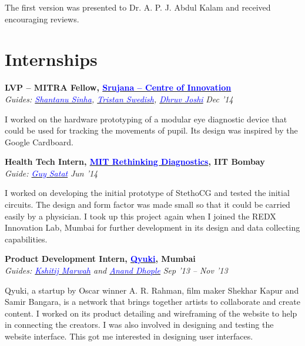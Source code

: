 \documentclass[margin,line]{res}
\newenvironment{list1}{
  \begin{list}{\ding{113}}{%
      \setlength{\itemsep}{0in}
      \setlength{\parsep}{0in} \setlength{\parskip}{0in}
      \setlength{\topsep}{0in} \setlength{\partopsep}{0in}
      \setlength{\leftmargin}{0.17in}}}{\end{list}}
\begin{document}
\begin{resume}
\begin{list1}
\noindent The first version was presented to Dr. A. P. J. Abdul Kalam and received encouraging reviews.
\end{list1}

\section{\sc Internships}

{\bf LVP -- MITRA Fellow, \href{http://lvpmitra.com/}{\textcolor{blue}{Srujana -- Centre of Innovation}}} \hfill  \\
{\em Guides: \href{https://www.media.mit.edu/~sssinha}{\textcolor{blue}{Shantanu Sinha}}, \href{https://web.media.mit.edu/~tswedish/}{\textcolor{blue}{Tristan Swedish}}, \href{https://www.linkedin.com/in/derbedhruv}{\textcolor{blue}{Dhruv Joshi}}} \hfill {\textit{Dec '14}} \\
\vspace*{-.13in}
\begin{list1}
\item[]
I worked on the hardware prototyping of a modular eye diagnostic device that could be used for tracking the movements of pupil. Its design was inspired by the Google Cardboard.
\end{list1}

{\bf Health Tech Intern, \href{https://redxmumbai.wordpress.com/about/}{\textcolor{blue} {MIT Rethinking Diagnostics}}, IIT Bombay} \\
{\em Guide: \href{http://web.media.mit.edu/~guysatat/}{\textcolor{blue}{Guy Satat}}} \hfill {\textit{Jun '14}} \\
\vspace*{-.13in}
\begin{list1}
\item[]
I worked on developing the initial prototype of StethoCG and tested the initial circuits. The design and form factor was made small so that it could be carried easily by a physician. I took up this project again when I joined the REDX Innovation Lab, Mumbai for further development in its design and data collecting capabilities.
\end{list1}

{\bf Product Development Intern, \href{www.qyuki.com}{\textcolor{blue}{Qyuki}}, Mumbai} \\
{\em Guides: \href{http://www.kshitijmarwah.com}{\textcolor{blue}{Kshitij Marwah}} and \href{https://www.linkedin.com/in/ananddhople}{\textcolor{blue}{Anand Dhople}}} \hfill {\textit{Sep '13 -- Nov '13}} \\
\vspace*{-.13in}
\begin{list1}
\item[]
Qyuki, a startup by Oscar winner A. R. Rahman, film maker Shekhar Kapur and Samir Bangara, is a network that brings together artists to collaborate and create content. I worked on its product detailing and wireframing of the website to help in connecting the creators. I was also involved in designing and testing the website interface. This got me interested in designing user interfaces.
\end{list1}


\end{resume}
\end{document}
